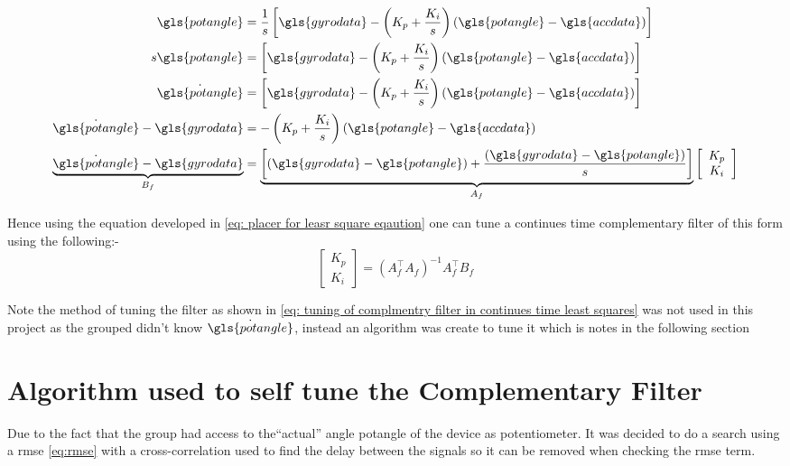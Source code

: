  \begin{align}
 \begin{split}
 \gls{potangle} &= \frac{1}{s}\left[ \gls{gyrodata} -\left(K_p + \frac{K_i}{s}\right) (\gls{potangle} - \gls{accdata})\right]\\
 s\gls{potangle} &= \left[ \gls{gyrodata} -\left(K_p + \frac{K_i}{s}\right) (\gls{potangle} - \gls{accdata})\right]\\
 \dot{\gls{potangle} }&= \left[ \gls{gyrodata} -\left(K_p + \frac{K_i}{s}\right) (\gls{potangle} - \gls{accdata})\right]\\
 \dot{\gls{potangle} } - \gls{gyrodata}& = -\left(K_p + \frac{K_i}{s}\right) (\gls{potangle} - \gls{accdata})\\
 \underbrace{\dot{\gls{potangle} } - \gls{gyrodata}}_{\text{$B_f$}}& = \underbrace{\left[(\gls{gyrodata} - \gls{potangle} ) + \frac{(\gls{gyrodata} - \gls{potangle} )}{s} \right] }_{\text{$A_f$}} \left[\begin{array}{c} K_p\\ K_i\end{array}\right] \label{eq: placer for leasr square eqaution}
 \end{split}
 \end{align}
 
Hence using the equation developed in \eqref{eq: placer for leasr square eqaution} one can tune a continues time complementary filter of this form using the following:- 
\begin{equation}
\left[\begin{array}{c} K_p\\ K_i\end{array}\right] = (A_f^\intercal A_f)^{-1}A_f^\intercal B_f \label{eq: tuning of complmentry filter in continues time least squares}
\end{equation} 

 Note the method of tuning the filter as shown in \eqref{eq: tuning of complmentry filter in continues time least squares} was not used in this project as the grouped didn't know $\dot{\gls{potangle} }$, instead an algorithm was create to tune it which is notes in the following section
  \tocless\section{Algorithm used to self tune the Complementary Filter}
 
 Due to the fact that the group had access to the\enquote{actual} angle \gls{potangle} of the device as potentiometer. It was decided to do a search using a \gls{rmse} \eqref{eq:rmse} with a cross-correlation used to find the delay between the signals so it can be removed when checking the \gls{rmse} term.
 
